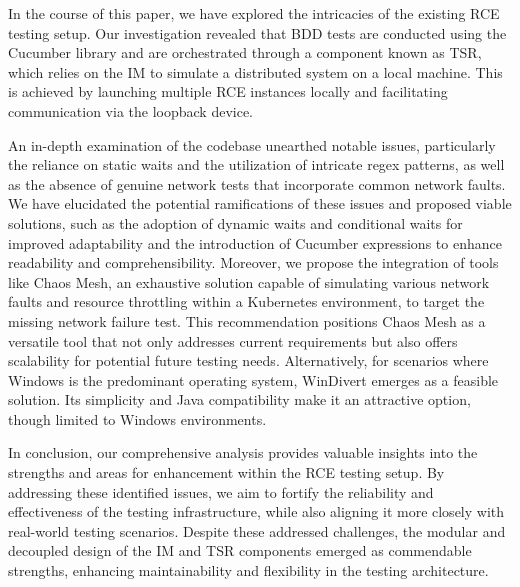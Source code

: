 In the course of this paper, we have explored the intricacies of the existing RCE testing setup. Our investigation revealed that \acf{BDD} tests are conducted using the Cucumber library and are orchestrated through a component known as \acf{TSR}, which relies on the \acf{IM} to simulate a distributed system on a local machine. This is achieved by launching multiple RCE instances locally and facilitating communication via the loopback device. 

An in-depth examination of the codebase unearthed notable issues, particularly the reliance on static waits and the utilization of intricate regex patterns, as well as the absence of genuine network tests that incorporate common network faults. We have elucidated the potential ramifications of these issues and proposed viable solutions, such as the adoption of dynamic waits and conditional waits for improved adaptability and the introduction of Cucumber expressions to enhance readability and comprehensibility. Moreover, we propose the integration of tools like Chaos Mesh, an exhaustive solution capable of simulating various network faults and resource throttling within a Kubernetes environment, to target the missing network failure test. This recommendation positions Chaos Mesh as a versatile tool that not only addresses current requirements but also offers scalability for potential future testing needs. Alternatively, for scenarios where Windows is the predominant operating system, WinDivert emerges as a feasible solution. Its simplicity and Java compatibility make it an attractive option, though limited to Windows environments. 

In conclusion, our comprehensive analysis provides valuable insights into the strengths and areas for enhancement within the RCE testing setup. By addressing these identified issues, we aim to fortify the reliability and effectiveness of the testing infrastructure, while also aligning it more closely with real-world testing scenarios. Despite these addressed challenges, the modular and decoupled design of the \ac{IM} and \ac{TSR} components emerged as commendable strengths, enhancing maintainability and flexibility in the testing architecture.

